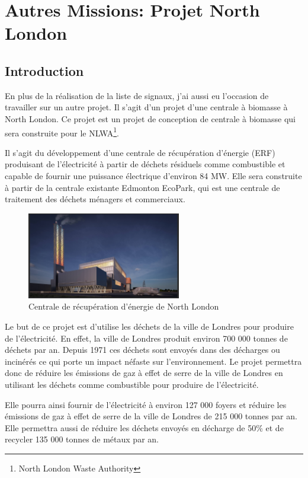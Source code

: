 \documentclass[11pt, openright]{book}
\begin{document}
\newpage
\section{Autres Missions: Projet North London}

\subsection{Introduction}

En plus de la réalisation de la liste de signaux, j'ai aussi eu l'occasion de travailler sur un autre projet. Il s'agit d'un projet d'une centrale à biomasse à North London. Ce projet est un projet de conception de centrale à biomasse qui sera construite pour le NLWA\footnote{North London Waste Authority}.

Il s'agit du développement d'une centrale de récupération d'énergie (ERF) produisant de l'élec\-tricité à partir de déchets résiduels comme combustible et capable de fournir une puissance électrique d'environ 84 MW.\cite{NLEAI} Elle sera construite à partir de la centrale existante Edmonton EcoPark, qui est une centrale de traitement des déchets ménagers et commerciaux.


\begin{figure}[ht!]
    \centering
    \includegraphics[width=0.6\textwidth]{./object/NLHP.jpg}
    \caption{Centrale de récupération d'énergie de North London}
\end{figure}


Le but de ce projet est d'utilise les déchets de la ville de Londres pour produire de l'électricité. En effet, la ville de Londres produit environ 700 000 tonnes de déchets par an. Depuis 1971 ces déchets sont envoyés dans des décharges ou incinérés ce qui porte un impact néfaste sur l'environ\-nement. Le projet permettra donc de réduire les émissions de gaz à effet de serre de la ville de Londres en utilisant les déchets comme combustible pour produire de l'électricité.

Elle pourra ainsi fournir de l'électricité à environ 127 000 foyers et réduire les émissions de gaz à effet de serre de la ville de Londres de 215 000 tonnes par an. Elle permettra aussi de réduire les déchets envoyés en décharge de 50\% et de recycler 135 000 tonnes de métaux par an.
\end{document}
